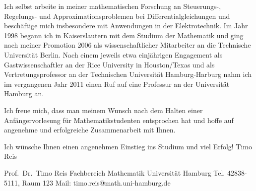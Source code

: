 Ich selbst arbeite in meiner mathematischen Forschung an Steuerungs-,
Regelungs- und Approximationsproblemen bei Differentialgleichungen und
besch\"aftige mich insbesondere mit Anwendungen in der Elektrotechnik. Im Jahr
1998 begann ich in Kaiserslautern mit dem Studium der Mathematik und ging nach
meiner Promotion 2006 als wissenschaftlicher Mitarbeiter an die Technische
Universit\"at Berlin. Nach einem jeweils etwa einj\"ahrigen Engagement als
Gastwissenschaftler an der Rice University in Houston/Texas und als
Vertretungsprofessor an der Technischen Universit\"at Hamburg-Harburg nahm ich
im vergangenen Jahr 2011 einen Ruf auf eine Professur an der Universit\"at
Hamburg an.

Ich freue mich, dass man meinem Wunsch nach dem Halten einer
Anf\"angervorlesung f\"ur Mathematikstudenten entsprochen hat und hoffe auf
angenehme und erfolgreiche Zusammenarbeit mit Ihnen.

Ich w\"unsche Ihnen einen angenehmen Einstieg ins Studium und viel Erfolg!
Timo Reis


Prof.~Dr.~Timo Reis
Fachbereich Mathematik
Universit\"at Hamburg
Tel. 42838-5111, Raum 123
Mail: timo.reis@math.uni-hamburg.de

